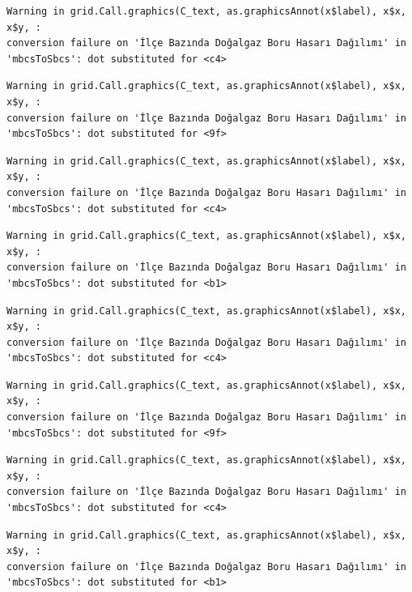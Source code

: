 \documentclass[
  11pt,
  a4paper,
  DIV=11,
  numbers=noendperiod]{scrartcl}
\begin{document}
\begin{verbatim}
Warning in grid.Call.graphics(C_text, as.graphicsAnnot(x$label), x$x, x$y, :
conversion failure on 'İlçe Bazında Doğalgaz Boru Hasarı Dağılımı' in
'mbcsToSbcs': dot substituted for <c4>
\end{verbatim}

\begin{verbatim}
Warning in grid.Call.graphics(C_text, as.graphicsAnnot(x$label), x$x, x$y, :
conversion failure on 'İlçe Bazında Doğalgaz Boru Hasarı Dağılımı' in
'mbcsToSbcs': dot substituted for <9f>
\end{verbatim}

\begin{verbatim}
Warning in grid.Call.graphics(C_text, as.graphicsAnnot(x$label), x$x, x$y, :
conversion failure on 'İlçe Bazında Doğalgaz Boru Hasarı Dağılımı' in
'mbcsToSbcs': dot substituted for <c4>
\end{verbatim}

\begin{verbatim}
Warning in grid.Call.graphics(C_text, as.graphicsAnnot(x$label), x$x, x$y, :
conversion failure on 'İlçe Bazında Doğalgaz Boru Hasarı Dağılımı' in
'mbcsToSbcs': dot substituted for <b1>
\end{verbatim}

\begin{verbatim}
Warning in grid.Call.graphics(C_text, as.graphicsAnnot(x$label), x$x, x$y, :
conversion failure on 'İlçe Bazında Doğalgaz Boru Hasarı Dağılımı' in
'mbcsToSbcs': dot substituted for <c4>
\end{verbatim}

\begin{verbatim}
Warning in grid.Call.graphics(C_text, as.graphicsAnnot(x$label), x$x, x$y, :
conversion failure on 'İlçe Bazında Doğalgaz Boru Hasarı Dağılımı' in
'mbcsToSbcs': dot substituted for <9f>
\end{verbatim}

\begin{verbatim}
Warning in grid.Call.graphics(C_text, as.graphicsAnnot(x$label), x$x, x$y, :
conversion failure on 'İlçe Bazında Doğalgaz Boru Hasarı Dağılımı' in
'mbcsToSbcs': dot substituted for <c4>
\end{verbatim}

\begin{verbatim}
Warning in grid.Call.graphics(C_text, as.graphicsAnnot(x$label), x$x, x$y, :
conversion failure on 'İlçe Bazında Doğalgaz Boru Hasarı Dağılımı' in
'mbcsToSbcs': dot substituted for <b1>
\end{verbatim}
\end{document}
